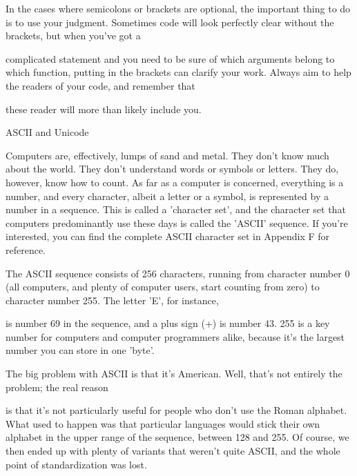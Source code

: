 \documentclass[a4paper,11pt]{book}
\begin{document}
\noindent 

\noindent In the cases where semicolons or brackets are optional, the important thing to do is to use your judgment. Sometimes code will look perfectly clear without the brackets, but when you've got a

\noindent complicated statement and you need to be sure of which arguments belong to which function, putting in the brackets can clarify your work. Always aim to help the readers of your code, and remember that

\noindent these reader will more than likely include you.

\noindent 

\noindent 

\noindent ASCII and Unicode

\noindent 

\noindent Computers are, effectively, lumps of sand and metal. They don't know much about the world. They don't understand words or symbols or letters. They do, however, know how to count. As far as a computer is concerned, everything is a number, and every character, albeit a letter or a symbol, is represented by a number in a sequence. This is called a 'character set', and the character set that computers predominantly use these days is called the 'ASCII' sequence. If you're interested, you can find the complete ASCII character set in Appendix F for reference.

\noindent 

\noindent The ASCII sequence consists of 256 characters, running from character number 0 (all computers, and plenty of computer users, start counting from zero) to character number 255. The letter 'E', for instance,

\noindent is number 69 in the sequence, and a plus sign (+) is number 43. 255 is a key number for computers and computer programmers alike, because it's the largest number you can store in one 'byte'.

\noindent 

\noindent The big problem with ASCII is that it's American. Well, that's not entirely the problem; the real reason

\noindent is that it's not particularly useful for people who don't use the Roman alphabet. What used to happen was that particular languages would stick their own alphabet in the upper range of the sequence, between 128 and 255. Of course, we then ended up with plenty of variants that weren't quite ASCII, and the whole point of standardization was lost.
\end{document}
